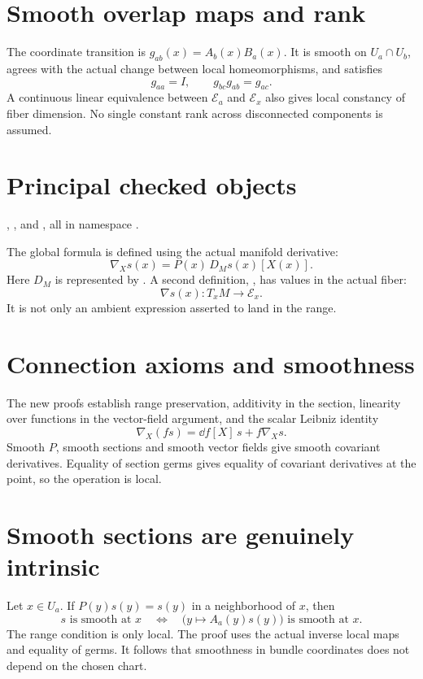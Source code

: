 \documentclass[10pt,letterpaper]{article}
\newcommand{\pageheading}[2]{\vspace*{2pt}{\small\color{ink}\textsc{#1}}\par\vspace{2pt}{\Large\bfseries #2}\par\vspace{4pt}}
\begin{document}
\section*{Smooth overlap maps and rank}
The coordinate transition is $g_{ab}(x)=A_b(x)B_a(x)$. It is smooth on $U_a\cap U_b$, agrees with the actual change between local homeomorphisms, and satisfies
\[
g_{aa}=I,\qquad g_{bc}g_{ab}=g_{ac}.
\]
A continuous linear equivalence between $\mathcal E_a$ and $\mathcal E_x$ also gives local constancy of fiber dimension. No single constant rank across disconnected components is assumed.

\section*{Principal checked objects}
, ,
 and
, all in namespace .

\newpage
\pageheading{Intrinsic sections and gluing}{A connection on the constructed bundle}
The global formula is defined using the actual manifold derivative:
\[
\nabla_Xs(x)=P(x)\,D_Ms(x)[X(x)].
\]
Here $D_M$ is represented by . A second definition, , has values in the actual fiber:
\[
\nabla s(x):T_xM\longrightarrow\mathcal E_x.
\]
It is not only an ambient expression asserted to land in the range.

\section*{Connection axioms and smoothness}
The new proofs establish range preservation, additivity in the section, linearity over functions in the vector-field argument, and the scalar Leibniz identity
\[
\nabla_X(fs)=\dd f[X]\,s+f\nabla_Xs.
\]
Smooth $P$, smooth sections and smooth vector fields give smooth covariant derivatives. Equality of section germs gives equality of covariant derivatives at the point, so the operation is local.

\section*{Smooth sections are genuinely intrinsic}
Let $x\in U_a$. If $P(y)s(y)=s(y)$ in a neighborhood of $x$, then
\[
s\text{ is smooth at }x
\quad\Longleftrightarrow\quad
\bigl(y\mapsto A_a(y)s(y)\bigr)\text{ is smooth at }x.
\]
The range condition is only local. The proof uses the actual inverse local maps and equality of germs. It follows that smoothness in bundle coordinates does not depend on the chosen chart.
\end{document}
